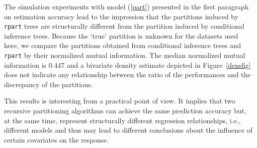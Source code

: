 The simulation experiments with model (\ref{part}) presented in the first
paragraph on estimation accuracy lead to the impression
that the partitions induced by \texttt{rpart} trees are structurally
different from the partition induced by conditional inference trees. Because
the `true' partition is unknown for the datasets used here, we
compare the partitions obtained from conditional inference trees and
\texttt{rpart} by their normalized mutual information.
The median normalized mutual information is  
$0.447$ and a bivariate density estimate depicted in
Figure~\ref{densfig} does not indicate any relationship between the ratio of
the performances and the discrepancy of the partitions. 

This results is interesting from a practical point of view. 
It implies that two recursive partitioning
algorithms can achieve the same prediction accuracy but, at the same time,
represent structurally different regression relationships, i.e., 
different models and thus may lead to different conclusions about the 
influence of certain covariates on the response.
